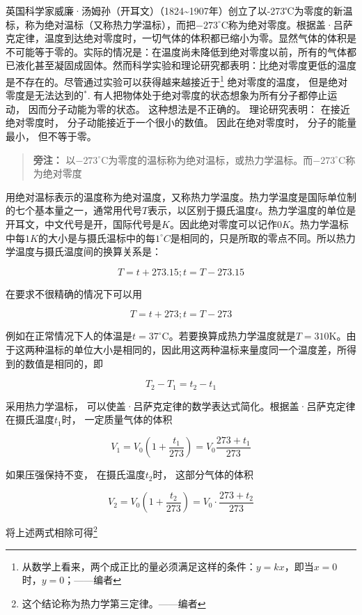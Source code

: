 英国科学家威廉·汤姆孙（开耳文）（1824\textasciitilde1907年）创立了以-273℃为零度的新温标，称为绝对温标（又称热力学温标），而把\(-273^{\circ}\mathrm{C}\)称为绝对零度。根据盖·吕萨克定律，温度到达绝对零度时，一切气体的体积都已缩小为零。显然气体的体积是不可能等于零的。实际的情况是：在温度尚未降低到绝对零度以前，所有的气体都已液化甚至凝固成固体。然而科学实验和理论研究都表明：比绝对零度更低的温度是不存在的。尽管通过实验可以获得越来越接近于\footnote{从数学上看来，两个成正比的量必须满足这样的条件：\(y = kx\)，即当\(x = 0\)时，\(y = 0\)；------编者}
绝对零度的温度， 但是绝对零度是无法达到的\(^{*}\).
有人把物体处于绝对零度的状态想象为所有分子都停止运动，
因而分子动能为零的状态。 这种想法是不正确的。 理论研究表明：
在接近绝对零度时， 分子动能接近于一个很小的数值。 因此在绝对零度时，
分子的能量最小， 但不等于零。

\begin{quote}
\textbf{旁注：}
以\(-273^{\circ}\mathrm{C}\)为零度的温标称为绝对温标，或热力学温标。而\(-273^{\circ}\mathrm{C}\)称为绝对零度
\end{quote}

用绝对温标表示的温度称为绝对温度，又称热力学温度。热力学温度是国际单位制的七个基本量之一，通常用代号\(T\)表示，以区别于摄氏温度\(t\)。热力学温度的单位是开耳文，中文代号是开，国际代号是\(K\)。因此绝对零度可以记作\(0K\)。热力学温标中每\(1K\)的大小是与摄氏温标中的每\(1^{\circ}C\)是相同的，只是所取的零点不同。所以热力学温度与摄氏温度间的换算关系是：

\[
T = t + 273.15; t = T - 273.15
\]

在要求不很精确的情况下可以用

\[
T = t + 273; t = T - 273
\]

例如在正常情况下人的体温是\(t = 37^{\circ}\mathrm{C}\)。若要换算成热力学温度就是\(T = 310\mathrm{K}\)。由于这两种温标的单位大小是相同的，因此用这两种温标来量度同一个温度差，所得到的数值是相同的，即

\[
T _ {2} - T _ {1} = t _ {2} - t _ {1}
\]

采用热力学温标，
可以使盖·吕萨克定律的数学表达式简化。根据盖·吕萨克定律在摄氏温度\(t_1\)时，
一定质量气体的体积

\[
V_1=V_0\left(1+\frac{t_1}{273}\right)=V_0\frac{273+t_1}{273}
\]

如果压强保持不变， 在摄氏温度\(t_2\)时， 这部分气体的体积

\[
V _ {2} = V _ {0} \left(1 + \frac {t _ {2}}{273}\right) = V _ {0} \cdot \frac {273 + t _ {2}}{273}
\]

将上述两式相除可得\footnote{这个结论称为热力学第三定律。------编者}

